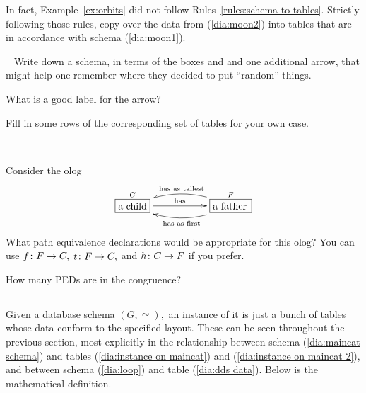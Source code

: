 \documentclass[../main/CT4S-EN-RU]{subfiles}
\begin{document}
\begin{exerciseENG}
In fact, Example~\ref{ex:orbits} did not follow Rules~\ref{rules:schema to tables}. Strictly following those rules, copy over the data from (\ref{dia:moon2}) into tables that are in accordance with schema (\ref{dia:moon1}).
\end{exerciseENG}

\begin{exerciseRUS}
\end{exerciseRUS}

\begin{exerciseENG}~
\sexc Write down a schema, in terms of the boxes  and  and one additional arrow, that might help one remember where they decided to put “random” things. 
\item What is a good label for the arrow? 
\item Fill in some rows of the corresponding set of tables for your own case.
\endsexc
\end{exerciseENG}

\begin{exerciseRUS}~
\end{exerciseRUS}

\begin{exerciseENG}\label{exc:father and child}
Consider the olog 
$$
\xymatrix{\obox{C}{.4in}{a child}\LA{rr}{has}&&\obox{F}{.5in}{a father}\ar@/^1pc/[ll]^{\tn{has as first}}\ar@/_1pc/[ll]_{\tn{has as tallest}}}
$$
\sexc What path equivalence declarations would be appropriate for this olog? You can use $f\colon F\rightarrow C,$ $t\colon F\rightarrow C,$ and $h\colon C\rightarrow F$ if you prefer. 
\item How many PEDs are in the congruence?
\endsexc
\end{exerciseENG}

\begin{exerciseRUS}\label{exc:father and child}
\end{exerciseRUS}


\subsection{}

\begin{blockENG}
Given a database schema $(G,\simeq),$ an instance of it is just a bunch of tables whose data conform to the specified layout. These can be seen throughout the previous section, most explicitly in the relationship between schema (\ref{dia:maincat schema}) and tables (\ref{dia:instance on maincat}) and (\ref{dia:instance on maincat 2}), and between schema (\ref{dia:loop}) and table (\ref{dia:dds data}). Below is the mathematical definition.
\end{blockENG}
\end{document}
